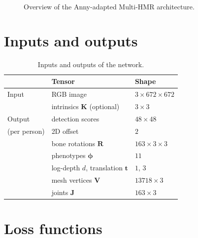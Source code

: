 \begin{figure}[t]
  \centering
  \caption{Overview of the Anny-adapted Multi-HMR architecture.}
  \label{fig:arch}
\end{figure}

\section{Inputs and outputs}

\begin{table}[h]
\centering\small
\begin{tabular}{lll}
\toprule
 & Tensor & Shape \\
\midrule
Input  & RGB image & $3{\times}672{\times}672$ \\
       & intrinsics $\mathbf{K}$ (optional) & $3{\times}3$ \\
\midrule
Output & detection scores & $48{\times}48$ \\
(per person) & 2D offset & $2$ \\
       & bone rotations $\mathbf{R}$ & $163{\times}3{\times}3$ \\
       & phenotypes $\boldsymbol{\phi}$ & $11$ \\
       & log-depth $d$, translation $\mathbf{t}$ & $1$, $3$ \\
       & mesh vertices $\mathbf{V}$ & $13718{\times}3$ \\
       & joints $\mathbf{J}$ & $163{\times}3$ \\
\bottomrule
\end{tabular}
\caption{Inputs and outputs of the network.}
\end{table}

\section{Loss functions}
\label{sec:loss}


